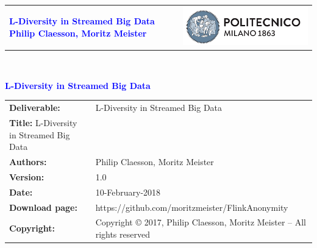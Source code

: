 

\renewcommand\thesubsection{\Alph{subsection}}




\begin{titlepage}



{\begin{table}[t!]
\centering
\begin{tabu} to \textwidth { X[1.3,r,p] X[1.7,l,p] }
\textcolor{Blue}
{\textbf{\small{L-Diversity in Streamed Big Data Philip Claesson, Moritz Meister}}} & \includegraphics[scale=0.5]{Images/PolimiLogo}
\end{tabu}
\end{table}}~\\ [7cm]


\begin{flushleft}

{\textcolor{Blue}{\textbf{\Huge{L-Diversity in Streamed Big Data}}}} \\ [1cm]

\end{flushleft}

\end{titlepage}

\begin{table}[h!]
\begin{tabu} to \textwidth { X[0.3,r,p] X[0.7,l,p] }
\hline

\textbf{Deliverable:} & L-Diversity in Streamed Big Data\\
\textbf{Title:} L-Diversity in Streamed Big Data \\
\textbf{Authors:} & Philip Claesson, Moritz Meister \\
\textbf{Version:} & 1.0 \\ 
\textbf{Date:} & 10-February-2018 \\
\textbf{Download page:} & https://github.com/moritzmeister/FlinkAnonymity \\
\textbf{Copyright:} & Copyright © 2017, Philip Claesson, Moritz Meister – All rights reserved \\
\hline
\end{tabu}
\end{table}




